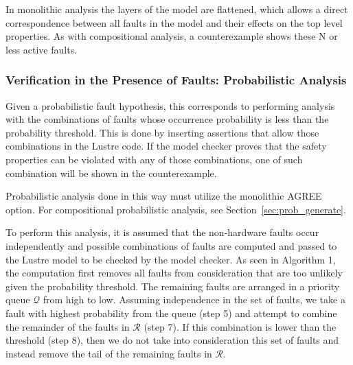 In monolithic analysis the layers of the model are flattened, which allows a direct correspondence between all faults in the model and their effects on the top level properties. As with compositional analysis, a counterexample shows these N or less active faults. 

\subsubsection{Verification in the Presence of Faults: Probabilistic Analysis} 
Given a probabilistic fault hypothesis, this corresponds to performing analysis with the combinations of faults whose occurrence probability is less than the probability threshold. This is done by inserting assertions that allow those combinations in the Lustre code. If the model checker proves that the safety properties can be violated with any of those combinations, one of such combination will be shown in the counterexample. 

Probabilistic analysis done in this way must utilize the monolithic AGREE option. For compositional probabilistic analysis, see Section~\ref{sec:prob_generate}.

To perform this analysis, it is assumed that the non-hardware faults occur independently and possible combinations of faults are computed and passed to the Lustre model to be checked by the model checker. As seen in Algorithm 1, the computation first removes all faults from consideration that are too unlikely given the probability threshold. The remaining faults are arranged in a priority queue $\mathcal{Q}$ from high to low. Assuming independence in the set of faults, we take a fault with highest probability from the queue (step 5) and attempt to combine the remainder of the faults in $\mathcal{R}$ (step 7). If this combination is lower than the threshold (step 8), then we do not take into consideration this set of faults and instead remove the tail of the remaining faults in $\mathcal{R}$. 
 
